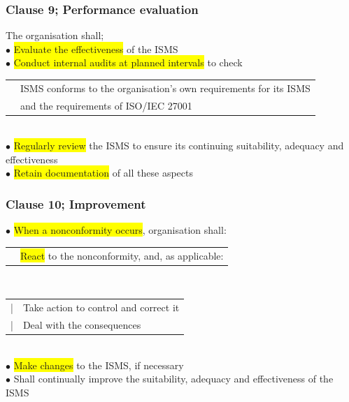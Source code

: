 \documentclass[tikz,border=10pt]{project_plan}
\newcommand{\bulletPoint}{\hspace{-3.1pt}$\bullet$ \hspace{5pt}}
\begin{document}
\subsubsection{Clause 9; Performance evaluation}
The organisation shall;\\
\bulletPoint \colorbox{yellow}{Evaluate the effectiveness} of the ISMS\\
\bulletPoint \colorbox{yellow}{Conduct internal audits at planned intervals} to check\\
\begin{tabular}{r |@{\bulletPoint} l}
   & ISMS conforms  to the organisation’s own requirements for its ISMS \\
   & and the requirements of ISO/IEC 27001                              \\
\end{tabular}\\
\bulletPoint \colorbox{yellow}{Regularly review} the ISMS to ensure its continuing suitability, adequacy and effectiveness\\
\bulletPoint \colorbox{yellow}{Retain documentation} of all these aspects\\

\subsubsection{Clause 10; Improvement}
\bulletPoint \colorbox{yellow}{When a nonconformity occurs}, organisation shall:\\
\begin{tabular}{r |@{\bulletPoint} l}
   & \colorbox{yellow}{React} to the nonconformity, and, as applicable: \\
\end{tabular}\\
\begin{tabular}{r |@{   \bulletPoint} l}
  |\hspace{\parindent} & Take action to control and correct it \\
  |\hspace{\parindent} & Deal with the consequences            \\
\end{tabular}           \\
\bulletPoint \colorbox{yellow}{Make changes} to the ISMS, if necessary\\
\bulletPoint Shall continually improve the suitability, adequacy and effectiveness of the ISMS

\newpage
\end{document}
